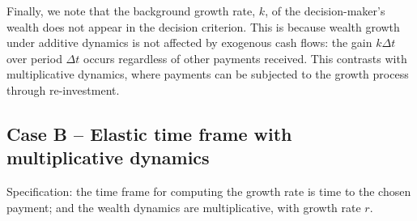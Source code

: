 \documentclass[11pt]{article}
\newcommand{\be}{\begin{equation}}
\newcommand{\ee}{\end{equation}}
\newcommand{\Dt}{\Delta t}
\newcommand{\Dx}{\Delta x}
\newcommand{\Epsilon}{\mathcal{E}}
\numberwithin{equation}{section}
\begin{document}
%
%
%
%

Finally, we note that the background growth rate, $k$, of the decision-maker's wealth does not appear in the decision criterion. This is because wealth growth under additive dynamics is not affected by exogenous cash flows: the gain $k\Dt$ over period $\Dt$ occurs regardless of other payments received. This contrasts with multiplicative dynamics, where payments can be subjected to the growth process through re-investment.

\subsection{Case B -- Elastic time frame with multiplicative dynamics}\label{sec:case_B}

Specification: the time frame for computing the growth rate is time to the chosen payment; and the wealth dynamics are multiplicative, with growth rate $r$.
\end{document}
